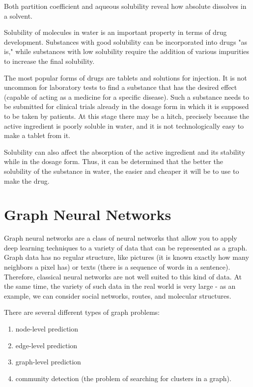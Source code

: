 \documentclass[a4paper,14pt]{article}
\begin{document}
Both partition coefficient and aqueous solubility reveal how
absolute dissolves in a solvent.

Solubility of molecules in water is an important property in terms of drug development. Substances with good solubility can be incorporated into drugs "as is," while substances with low solubility require the addition of various impurities to increase the final solubility. 

The most popular forms of drugs are tablets and solutions for injection. It is not uncommon for laboratory tests to find a substance that has the desired effect (capable of acting as a medicine for a specific disease). Such a substance needs to be submitted for clinical trials already in the dosage form in which it is supposed to be taken by patients. At this stage there may be a hitch, precisely because the active ingredient is poorly soluble in water, and it is not technologically easy to make a tablet from it.

Solubility can also affect the absorption of the active ingredient and its stability while in the dosage form. Thus, it can be determined that the better the solubility of the substance in water, the easier and cheaper it will be to use to make the drug.

\section{Graph Neural Networks}\label{3}

Graph neural networks are a class of neural networks that allow you to apply deep learning techniques to a variety of data that can be represented as a graph. Graph data has no regular structure, like pictures (it is known exactly how many neighbors a pixel has) or texts (there is a sequence of words in a sentence). Therefore, classical neural networks are not well suited to this kind of data. At the same time, the variety of such data in the real world is very large - as an example, we can consider social networks, routes, and molecular structures. 

There are several different types of graph problems:
\begin{enumerate}
  \item node-level prediction
  \item edge-level prediction
  \item graph-level prediction
  \item community detection (the problem of searching for clusters in a graph).
\end{enumerate}
\end{document}
